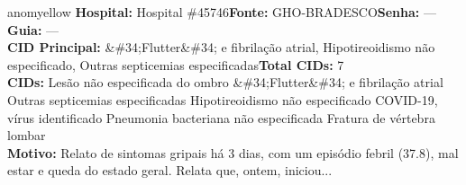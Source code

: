 \documentclass[a4paper,10pt]{article}
\begin{document}
\begin{anomalycard}[Interna\c{c}\~{a}o \#120130 | Pac. \#99598 | MODERADO (z=2.07) | LOS: 6d | 05/03/2026\,$\to$\,11/03/2026]{anomyellow}
\textbf{Hospital:} Hospital \#45746\quad \textbf{Fonte:} GHO-BRADESCO\quad \textbf{Senha:} ---\quad \textbf{Guia:} ---\\

\textbf{CID Principal:} {\small \&\#34;Flutter\&\#34; e fibrilação atrial, Hipotireoidismo não especificado, Outras septicemias especificadas}\quad\textbf{Total CIDs:} 7\\

\textbf{CIDs:} {\scriptsize Lesão não especificada do ombro \textbar{} \&\#34;Flutter\&\#34; e fibrilação atrial \textbar{} Outras septicemias especificadas \textbar{} Hipotireoidismo não especificado \textbar{} COVID-19, vírus identificado \textbar{} Pneumonia bacteriana não especificada \textbar{} Fratura de vértebra lombar}\\

\textbf{Motivo:} {\scriptsize Relato de sintomas gripais há 3 dias, com um episódio febril (37.8), mal estar e queda do estado geral. Relata que, ontem, iniciou...}\\




\end{anomalycard}
\end{document}
